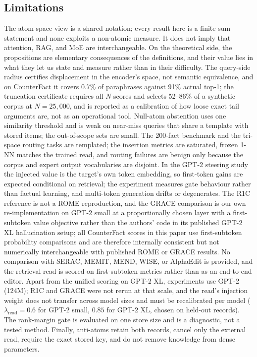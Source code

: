\documentclass[preprint,12pt]{elsarticle}
\newif\ifmarkchanges
\newcommand{\rev}[1]{\ifmarkchanges{\color{blue}#1}\else#1\fi}
\begin{document}
\subsection{Limitations}
The atom-space view is a shared notation; every result here is a finite-sum statement and none exploits a non-atomic measure. It does not imply that attention, RAG, and MoE are interchangeable. On the theoretical side, \rev{the propositions are elementary consequences of the definitions, and their value lies in what they let us state and measure rather than in their difficulty. The query-side radius certifies displacement in the encoder's space, not semantic equivalence, and on CounterFact it covers 0.7\% of paraphrases against 91\% actual top-1}; the truncation certificate requires all $N$ scores and selects 52--86\% of a synthetic corpus at $N=25{,}000$, and is reported as a calibration of how loose exact tail arguments are, not as an operational tool. \rev{Null-atom abstention uses one similarity threshold and is weak on near-miss queries that share a template with stored items; the out-of-scope sets are small.} The 200-fact benchmark and the tri-space routing tasks are templated; the insertion metrics are saturated, frozen 1-NN matches the trained read, and routing failures are benign only because the corpus and expert output vocabularies are disjoint. In the GPT-2 steering study the injected value is the target's own token embedding, so first-token gains are expected conditional on retrieval; the experiment measures gate behaviour rather than factual learning, and multi-token generation drifts or degenerates. The R1C reference is not a ROME reproduction, and the GRACE comparison is our own re-implementation on GPT-2 small at a proportionally chosen layer with a first-subtoken value objective rather than the authors' code in its published GPT-2 XL hallucination setup; all CounterFact scores in this paper use first-subtoken probability comparisons and are therefore internally consistent but not numerically interchangeable with published ROME or GRACE results. No comparison with SERAC, MEMIT, MEND, WISE, or AlphaEdit is provided, and the retrieval read is scored on first-subtoken metrics rather than as an end-to-end editor. \rev{Apart from the unified scoring on GPT-2 XL, experiments use GPT-2 (124M); R1C and GRACE were not rerun at that scale, and the read's injection weight does not transfer across model sizes and must be recalibrated per model ($\lambda_{\mathrm{read}}=0.6$ for GPT-2 small, $0.85$ for GPT-2 XL, chosen on held-out records).} \rev{The rank-margin gate is evaluated on one store size and is a diagnostic, not a tested method.} Finally, anti-atoms retain both records, cancel only the external read, require the exact stored key, and do not remove knowledge from dense parameters.
\end{document}
